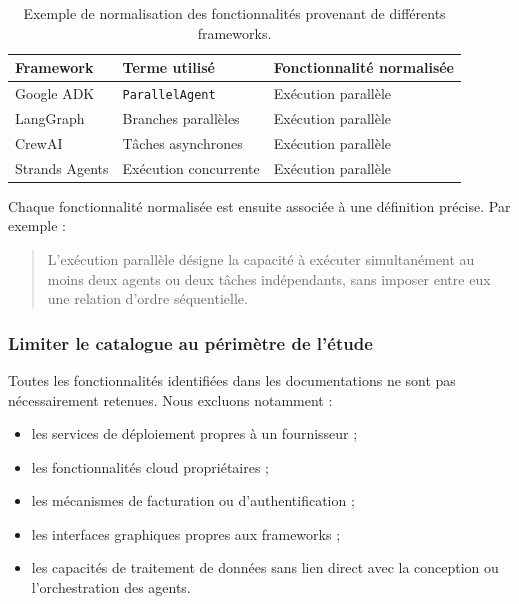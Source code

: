\begin{table}[t]
    \centering
    \caption{Exemple de normalisation des fonctionnalités provenant de
    différents frameworks.}
    \label{tab:normalisation-fonctionnalites}
    \begin{tabularx}{\textwidth}{@{}l l >{\raggedright\arraybackslash}X@{}}
        \toprule
        \textbf{Framework}
        & \textbf{Terme utilisé}
        & \textbf{Fonctionnalité normalisée} \\
        \midrule
        Google ADK
            & \texttt{ParallelAgent}
            & Exécution parallèle \\
        LangGraph
            & Branches parallèles
            & Exécution parallèle \\
        CrewAI
            & Tâches asynchrones
            & Exécution parallèle \\
        Strands Agents
            & Exécution concurrente
            & Exécution parallèle \\
        \bottomrule
    \end{tabularx}
\end{table}

Chaque fonctionnalité normalisée est ensuite associée à une définition
précise. Par exemple :

\begin{quote}
L'exécution parallèle désigne la capacité à exécuter simultanément au
moins deux agents ou deux tâches indépendants, sans imposer entre eux
une relation d'ordre séquentielle.
\end{quote}


\subsubsection{Limiter le catalogue au périmètre de l'étude}

Toutes les fonctionnalités identifiées dans les documentations ne sont
pas nécessairement retenues. Nous excluons notamment :

\begin{itemize}
    \item les services de déploiement propres à un fournisseur ;
    \item les fonctionnalités cloud propriétaires ;
    \item les mécanismes de facturation ou d'authentification ;
    \item les interfaces graphiques propres aux frameworks ;
    \item les capacités de traitement de données sans lien direct avec
    la conception ou l'orchestration des agents.
\end{itemize}

